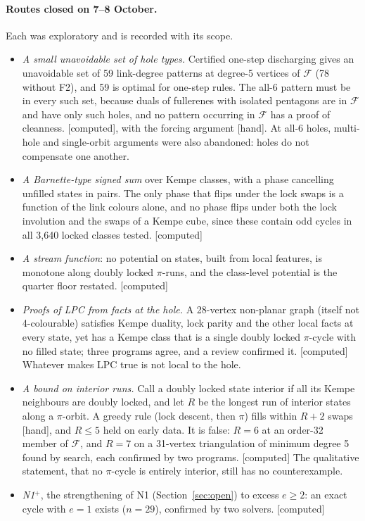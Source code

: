 \documentclass[11pt]{article}
\newcommand{\lab}[1]{\textsf{[#1]}}
\begin{document}
\paragraph{Routes closed on 7--8 October.} Each was exploratory and is recorded with its scope.
\begin{itemize}
\item \emph{A small unavoidable set of hole types.} Certified one-step discharging gives an unavoidable set of 59 link-degree patterns at degree-5 vertices of $\mathcal F$ (78 without F2), and 59 is optimal for one-step rules. The all-6 pattern must be in every such set, because duals of fullerenes with isolated pentagons are in $\mathcal F$ and have only such holes, and no pattern occurring in $\mathcal F$ has a proof of cleanness. \lab{computed}, with the forcing argument \lab{hand}. At all-6 holes, multi-hole and single-orbit arguments were also abandoned: holes do not compensate one another.
\item \emph{A Barnette-type signed sum} over Kempe classes, with a phase cancelling unfilled states in pairs. The only phase that flips under the lock swaps is a function of the link colours alone, and no phase flips under both the lock involution and the swaps of a Kempe cube, since these contain odd cycles in all 3{,}640 locked classes tested. \lab{computed}
\item \emph{A stream function}: no potential on states, built from local features, is monotone along doubly locked $\pi$-runs, and the class-level potential is the quarter floor restated. \lab{computed}
\item \emph{Proofs of LPC from facts at the hole.} A 28-vertex non-planar graph (itself not 4-colourable) satisfies Kempe duality, lock parity and the other local facts at every state, yet has a Kempe class that is a single doubly locked $\pi$-cycle with no filled state; three programs agree, and a review confirmed it. \lab{computed} Whatever makes LPC true is not local to the hole.
\item \emph{A bound on interior runs.} Call a doubly locked state interior if all its Kempe neighbours are doubly locked, and let $R$ be the longest run of interior states along a $\pi$-orbit. A greedy rule (lock descent, then $\pi$) fills within $R+2$ swaps \lab{hand}, and $R\le5$ held on early data. It is false: $R=6$ at an order-32 member of $\mathcal F$, and $R=7$ on a 31-vertex triangulation of minimum degree 5 found by search, each confirmed by two programs. \lab{computed} The qualitative statement, that no $\pi$-cycle is entirely interior, still has no counterexample.
\item \emph{N1$^+$}, the strengthening of N1 (Section~\ref{sec:open}) to excess $e\ge2$: an exact cycle with $e=1$ exists ($n=29$), confirmed by two solvers. \lab{computed}
\end{itemize}
\end{document}
